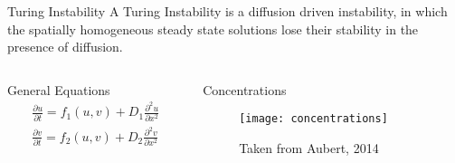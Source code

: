 \documentclass[pdf]{beamer}
\begin{document}
\begin{frame}{Turing Instability}
	A Turing Instability is a diffusion driven instability, in which the spatially homogeneous steady state solutions lose their stability in the presence of diffusion.
	
	\begin{columns}[T]
    \begin{column}{.5\textwidth}
     \begin{block}{General Equations}
\begin{align*}
        \frac{\partial u}{\partial t} = f_1(u,v) +  D_1\frac{\partial^2 u}{\partial x^2} \\
        \frac{\partial v}{\partial t} = f_2(u,v) + D_2\frac{\partial^2 v}{\partial x^2} \\ 
    \end{align*}
    \end{block}
    \end{column}
    \begin{column}{.5\textwidth}
    \begin{block}{Concentrations}
    \begin{figure}[l]
    \texttt{[image: concentrations]}
    \caption{Taken from Aubert, 2014}
    \end{figure}
    \end{block}
    \end{column}
  \end{columns}
\end{frame}
\end{document}
